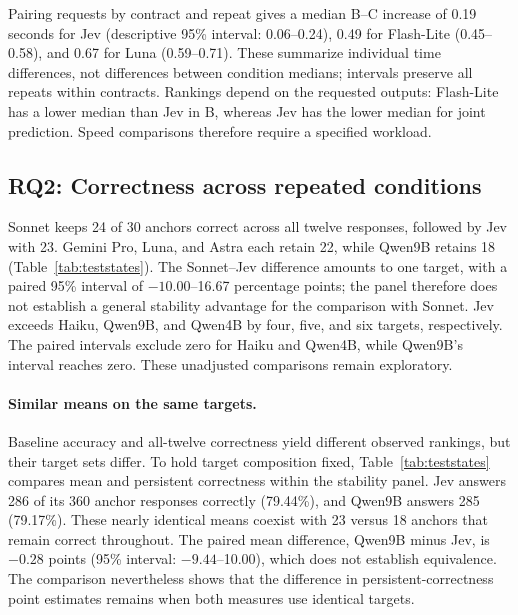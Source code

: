 \documentclass{article}
\begin{document}
Pairing requests by contract and repeat gives a median B--C increase of 0.19 seconds for Jev (descriptive 95\% interval: 0.06--0.24), 0.49 for Flash-Lite (0.45--0.58), and 0.67 for Luna (0.59--0.71). These summarize individual time differences, not differences between condition medians; intervals preserve all repeats within contracts. Rankings depend on the requested outputs: Flash-Lite has a lower median than Jev in B, whereas Jev has the lower median for joint prediction. Speed comparisons therefore require a specified workload.

\subsection{RQ2: Correctness across repeated conditions}

Sonnet keeps 24 of 30 anchors correct across all twelve responses, followed by Jev with 23. Gemini Pro, Luna, and Astra each retain 22, while Qwen9B retains 18 (Table~\ref{tab:teststates}). The Sonnet--Jev difference amounts to one target, with a paired 95\% interval of $-10.00$--16.67 percentage points; the panel therefore does not establish a general stability advantage for the comparison with Sonnet. Jev exceeds Haiku, Qwen9B, and Qwen4B by four, five, and six targets, respectively. The paired intervals exclude zero for Haiku and Qwen4B, while Qwen9B's interval reaches zero. These unadjusted comparisons remain exploratory.

\paragraph{Similar means on the same targets.}
Baseline accuracy and all-twelve correctness yield different observed rankings, but their target sets differ. To hold target composition fixed, Table~\ref{tab:teststates} compares mean and persistent correctness within the stability panel. Jev answers 286 of its 360 anchor responses correctly (79.44\%), and Qwen9B answers 285 (79.17\%). These nearly identical means coexist with 23 versus 18 anchors that remain correct throughout. The paired mean difference, Qwen9B minus Jev, is $-0.28$ points (95\% interval: $-9.44$--10.00), which does not establish equivalence. The comparison nevertheless shows that the difference in persistent-correctness point estimates remains when both measures use identical targets.
\end{document}
